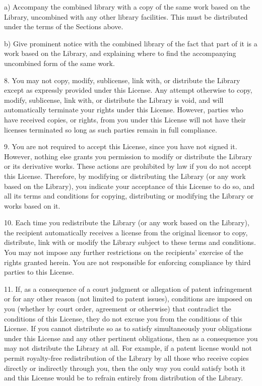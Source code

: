\begin{indented}{1cm}
a) Accompany the combined library with a copy of the same work
based on the Library, uncombined with any other library
facilities. This must be distributed under the terms of the
Sections above.

b) Give prominent notice with the combined library of the fact
that part of it is a work based on the Library, and explaining
where to find the accompanying uncombined form of the same work.
\end{indented}

8. You may not copy, modify, sublicense, link with, or distribute
the Library except as expressly provided under this License. Any
attempt otherwise to copy, modify, sublicense, link with, or
distribute the Library is void, and will automatically terminate your
rights under this License. However, parties who have received copies,
or rights, from you under this License will not have their licenses
terminated so long as such parties remain in full compliance.

9. You are not required to accept this License, since you have not
signed it. However, nothing else grants you permission to modify or
distribute the Library or its derivative works. These actions are
prohibited by law if you do not accept this License. Therefore, by
modifying or distributing the Library (or any work based on the
Library), you indicate your acceptance of this License to do so, and
all its terms and conditions for copying, distributing or modifying
the Library or works based on it.

10. Each time you redistribute the Library (or any work based on the
Library), the recipient automatically receives a license from the
original licensor to copy, distribute, link with or modify the Library
subject to these terms and conditions. You may not impose any further
restrictions on the recipients' exercise of the rights granted herein.
You are not responsible for enforcing compliance by third parties to
this License.

11. If, as a consequence of a court judgment or allegation of patent
infringement or for any other reason (not limited to patent issues),
conditions are imposed on you (whether by court order, agreement or
otherwise) that contradict the conditions of this License, they do not
excuse you from the conditions of this License. If you cannot
distribute so as to satisfy simultaneously your obligations under this
License and any other pertinent obligations, then as a consequence you
may not distribute the Library at all. For example, if a patent
license would not permit royalty-free redistribution of the Library by
all those who receive copies directly or indirectly through you, then
the only way you could satisfy both it and this License would be to
refrain entirely from distribution of the Library.

